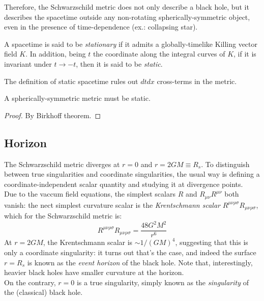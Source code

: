 Therefore, the Schwarzschild metric does not only describe a black hole, but it describes the spacetime outside any non-rotating spherically-symmetric object, even in the presence of time-dependence (ex.: collapsing star).

\begin{definition}\label{def-t-ind}
  A spacetime is said to be \textit{stationary} if it admits a globally-timelike Killing vector field $ K $. In addition, being $ t $ the coordinate along the integral curves of $ K $, if it is invariant under $ t \rightarrow -t $, then it is said to be \textit{static}.
\end{definition}

The definition of static spacetime rules out $ dt dx $ cross-terms in the metric.

\begin{proposition}
  A spherically-symmetric metric must be static.
\end{proposition}
\begin{proof}
  By Birkhoff theorem.
\end{proof}

\subsection{Horizon}

The Schwarzschild metric diverges at $ r = 0 $ and $ r = 2GM \equiv R_s $. To distinguish between true singularities and coordinate singularities, the usual way is defining a coordinate-independent scalar quantity and studying it at divergence points.\\
Due to the vaccum field equations, the simplest scalars $ R $ and $ R_{\mu \nu} R^{\mu \nu} $ both vanish: the nect simplest curvature scalar is the \textit{Krentschmann scalar} $ R^{\mu \nu \rho \sigma} R_{\mu \nu \rho \sigma} $, which for the Schwarzschild metric is:
\begin{equation}
  R^{\mu \nu \rho \sigma} R_{\mu \nu \rho \sigma} = \frac{48 G^2 M^2}{r^6}
  \label{eq:6.2}
\end{equation}
At $ r = 2GM $, the Krentschmann scalar is $ \sim 1 / (GM)^4 $, suggesting that this is only a coordinate singularity: it turns out that's the case, and indeed the surface $ r = R_s $ is known as the \textit{event horizon} of the black hole. Note that, interestingly, heavier black holes have smaller curvature at the horizon.\\
On the contrary, $ r = 0 $ is a true singularity, simply known as the \textit{singularity} of the (classical) black hole.

